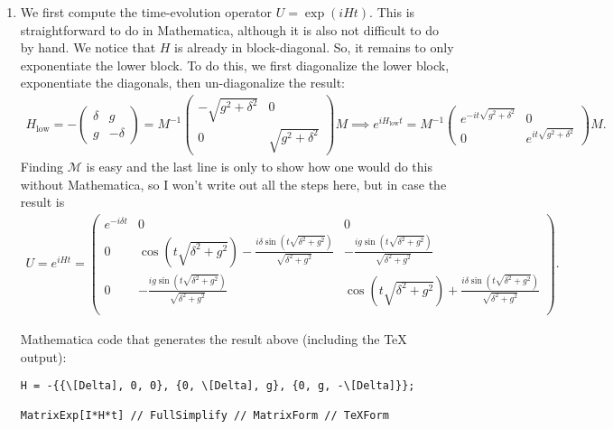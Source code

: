 \documentclass{article}
\theoremstyle{definition}
\begin{document}
\begin{enumerate}[label=(\alph*)]

\item We first compute the time-evolution operator $U = \exp(i H t)$. This is straightforward to do in Mathematica, although it is also not difficult to do by hand. We notice that $H$ is already in block-diagonal. So, it remains to only exponentiate the lower block. To do this, we first diagonalize the lower block, exponentiate the diagonals, then un-diagonalize the result:
\begin{align*}
H_\text{low} = -\begin{pmatrix}
\delta & g \\ g & -\delta
\end{pmatrix} 
=
M^{-1} \begin{pmatrix}
-\sqrt{g^2 + \delta^2} & 0 \\ 0 & \sqrt{g^2 + \delta^2}
\end{pmatrix}
M
\implies 
e^{i H_\text{low} t} = 
M^{-1} 
\begin{pmatrix}
e^{-it\sqrt{g^2 + \delta^2}} & 0 \\ 0 & e^{it\sqrt{g^2 + \delta^2}}
\end{pmatrix}
M.
\end{align*}
Finding $\mathcal{M}$ is easy and the last line is only to show how one would do this without Mathematica, so I won't write out all the steps here, but in case the result is 
\begin{align*}
U = e^{iHt} = 
\left(
\begin{array}{ccc}
 e^{-i \delta  t} & 0 & 0 \\
 0 & \cos \left(t \sqrt{\delta ^2+g^2}\right)-\frac{i \delta  \sin \left(t \sqrt{\delta
   ^2+g^2}\right)}{\sqrt{\delta ^2+g^2}} & -\frac{i g \sin \left(t \sqrt{\delta
   ^2+g^2}\right)}{\sqrt{\delta ^2+g^2}} \\
 0 & -\frac{i g \sin \left(t \sqrt{\delta ^2+g^2}\right)}{\sqrt{\delta ^2+g^2}} & \cos
   \left(t \sqrt{\delta ^2+g^2}\right)+\frac{i \delta  \sin \left(t \sqrt{\delta
   ^2+g^2}\right)}{\sqrt{\delta ^2+g^2}} \\
\end{array}
\right).
\end{align*}

Mathematica code that generates the result above (including the TeX output):
\begin{lstlisting}
H = -{{\[Delta], 0, 0}, {0, \[Delta], g}, {0, g, -\[Delta]}};

MatrixExp[I*H*t] // FullSimplify // MatrixForm // TeXForm
\end{lstlisting}



\end{enumerate}
\end{document}
